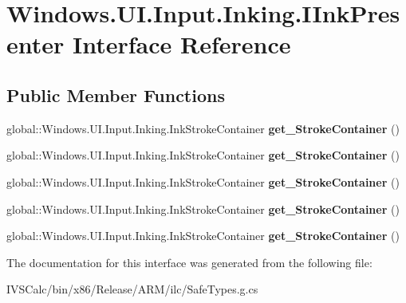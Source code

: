 \hypertarget{interface_windows_1_1_u_i_1_1_input_1_1_inking_1_1_i_ink_presenter}{}\section{Windows.\+U\+I.\+Input.\+Inking.\+I\+Ink\+Presenter Interface Reference}
\label{interface_windows_1_1_u_i_1_1_input_1_1_inking_1_1_i_ink_presenter}
\subsection*{Public Member Functions}
\begin{DoxyCompactItemize}
\item 
\mbox{\label{interface_windows_1_1_u_i_1_1_input_1_1_inking_1_1_i_ink_presenter_abdd966f455f9d60874940898d80e90ef}} 
global\+::\+Windows.\+U\+I.\+Input.\+Inking.\+Ink\+Stroke\+Container {\bfseries get\+\_\+\+Stroke\+Container} ()
\item 
\mbox{\label{interface_windows_1_1_u_i_1_1_input_1_1_inking_1_1_i_ink_presenter_abdd966f455f9d60874940898d80e90ef}} 
global\+::\+Windows.\+U\+I.\+Input.\+Inking.\+Ink\+Stroke\+Container {\bfseries get\+\_\+\+Stroke\+Container} ()
\item 
\mbox{\label{interface_windows_1_1_u_i_1_1_input_1_1_inking_1_1_i_ink_presenter_abdd966f455f9d60874940898d80e90ef}} 
global\+::\+Windows.\+U\+I.\+Input.\+Inking.\+Ink\+Stroke\+Container {\bfseries get\+\_\+\+Stroke\+Container} ()
\item 
\mbox{\label{interface_windows_1_1_u_i_1_1_input_1_1_inking_1_1_i_ink_presenter_abdd966f455f9d60874940898d80e90ef}} 
global\+::\+Windows.\+U\+I.\+Input.\+Inking.\+Ink\+Stroke\+Container {\bfseries get\+\_\+\+Stroke\+Container} ()
\item 
\mbox{\label{interface_windows_1_1_u_i_1_1_input_1_1_inking_1_1_i_ink_presenter_abdd966f455f9d60874940898d80e90ef}} 
global\+::\+Windows.\+U\+I.\+Input.\+Inking.\+Ink\+Stroke\+Container {\bfseries get\+\_\+\+Stroke\+Container} ()
\end{DoxyCompactItemize}


The documentation for this interface was generated from the following file\+:\begin{DoxyCompactItemize}
\item 
I\+V\+S\+Calc/bin/x86/\+Release/\+A\+R\+M/ilc/Safe\+Types.\+g.\+cs\end{DoxyCompactItemize}

